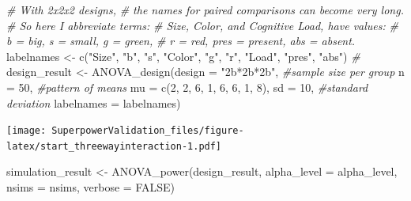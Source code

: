 \documentclass[
]{book}
\newenvironment{Shaded}{\begin{snugshade}}{\end{snugshade}}
\newcommand{\AttributeTok}[1]{\textcolor[rgb]{0.77,0.63,0.00}{#1}}
\newcommand{\CommentTok}[1]{\textcolor[rgb]{0.56,0.35,0.01}{\textit{#1}}}
\newcommand{\ConstantTok}[1]{\textcolor[rgb]{0.00,0.00,0.00}{#1}}
\newcommand{\DecValTok}[1]{\textcolor[rgb]{0.00,0.00,0.81}{#1}}
\newcommand{\FunctionTok}[1]{\textcolor[rgb]{0.00,0.00,0.00}{#1}}
\newcommand{\NormalTok}[1]{#1}
\newcommand{\OtherTok}[1]{\textcolor[rgb]{0.56,0.35,0.01}{#1}}
\newcommand{\StringTok}[1]{\textcolor[rgb]{0.31,0.60,0.02}{#1}}
\begin{document}
\begin{Shaded}
\begin{Highlighting}[]
\CommentTok{\# With 2x2x2 designs, }
\CommentTok{\# the names for paired comparisons can become very long. }
\CommentTok{\# So here I abbreviate terms: }
\CommentTok{\#   Size, Color, and Cognitive Load, have values:}
\CommentTok{\# b = big, s = small, g = green, }
\CommentTok{\# r = red, pres = present, abs = absent.  }
\NormalTok{labelnames }\OtherTok{\textless{}{-}} \FunctionTok{c}\NormalTok{(}\StringTok{"Size"}\NormalTok{, }\StringTok{"b"}\NormalTok{, }\StringTok{"s"}\NormalTok{, }\StringTok{"Color"}\NormalTok{, }\StringTok{"g"}\NormalTok{, }\StringTok{"r"}\NormalTok{, }
                \StringTok{"Load"}\NormalTok{, }\StringTok{"pres"}\NormalTok{, }\StringTok{"abs"}\NormalTok{) }\CommentTok{\#}
\NormalTok{design\_result }\OtherTok{\textless{}{-}} \FunctionTok{ANOVA\_design}\NormalTok{(}\AttributeTok{design =} \StringTok{"2b*2b*2b"}\NormalTok{, }
                              \CommentTok{\#sample size per group }
                              \AttributeTok{n =} \DecValTok{50}\NormalTok{, }
                              \CommentTok{\#pattern of means}
                              \AttributeTok{mu =} \FunctionTok{c}\NormalTok{(}\DecValTok{2}\NormalTok{, }\DecValTok{2}\NormalTok{, }\DecValTok{6}\NormalTok{, }\DecValTok{1}\NormalTok{, }\DecValTok{6}\NormalTok{, }\DecValTok{6}\NormalTok{, }\DecValTok{1}\NormalTok{, }\DecValTok{8}\NormalTok{), }
                              \AttributeTok{sd =} \DecValTok{10}\NormalTok{, }\CommentTok{\#standard deviation}
                              \AttributeTok{labelnames =}\NormalTok{ labelnames) }
\end{Highlighting}
\end{Shaded}

\texttt{[image: SuperpowerValidation\_files/figure-latex/start\_threewayinteraction-1.pdf]}

\begin{Shaded}
\begin{Highlighting}[]
\NormalTok{simulation\_result }\OtherTok{\textless{}{-}} \FunctionTok{ANOVA\_power}\NormalTok{(design\_result, }
                                 \AttributeTok{alpha\_level =}\NormalTok{ alpha\_level, }
                                 \AttributeTok{nsims =}\NormalTok{ nsims,}
                                 \AttributeTok{verbose =} \ConstantTok{FALSE}\NormalTok{)}
\end{Highlighting}
\end{Shaded}
\end{document}
